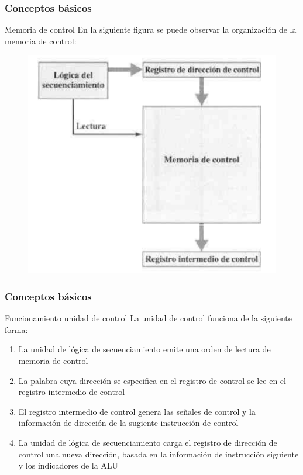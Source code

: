 \documentclass{beamer}
\begin{document}
\begin{frame}
	\frametitle{Conceptos básicos}
	\begin{block}{Memoria de control}
	En la siguiente figura se puede observar la organización de la memoria de control:
	\end{block}	
	\begin{figure}[H]
		\centering
		\includegraphics[scale=0.4]{imagenes/organizacionmemoriacontrol.png} 
	\end{figure}
\end{frame}

\begin{frame}
	\frametitle{Conceptos básicos}
	\begin{block}{Funcionamiento unidad de control}
	La unidad de control funciona de la siguiente forma:
	\begin{enumerate}
		\item La unidad de lógica de secuenciamiento emite una orden de lectura de memoria de control
		\item La palabra cuya dirección se especifica en el registro de control se lee en el registro intermedio de control
		\item El registro intermedio de control genera las señales de control y la información de dirección de la sugiente instrucción de control
		\item La unidad de lógica de secuenciamiento carga el registro de dirección de control una nueva dirección, basada en la información de instrucción siguiente y los indicadores de la ALU
	\end{enumerate}
	\end{block}	
	
\end{frame}
\end{document}
